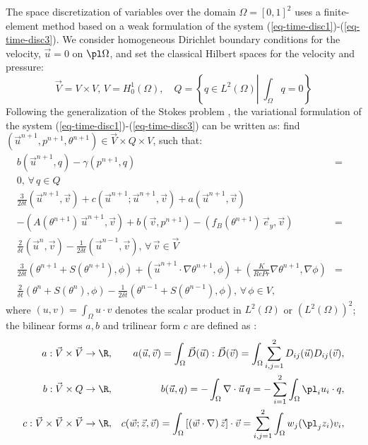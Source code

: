 The space discretization of variables over the domain $\Omega=[0,1]^2$ uses a finite-element method based on a weak formulation of the system (\ref{eq-time-disc1})-(\ref{eq-time-disc3}). 
We consider homogeneous Dirichlet boundary conditions for the velocity, \ie $\vec{u}=0$ on $\pl \Omega$, and set the classical Hilbert spaces for the velocity and pressure:
\begin{equation}
\vec{V}=V\times V, \, V=H^1_0(\Omega), \quad Q=\left\{q\in L^2(\Omega)\left|\; \int_{\Omega}q=0\right.\right\}
\end{equation}
Following the generalization of the Stokes problem \citep{Temam,GRaviart,Quarteroni}, the variational formulation of the system  (\ref{eq-time-disc1})-(\ref{eq-time-disc3}) can be written as: find $(\vec{u}^{n+1}, p^{n+1}, \theta^{n+1}) \in \vec{V}\times Q\times V$, such that:
\begin{eqnarray}
\label{eq-weak-all}
b\left(\vec{u}^{n+1}, q\right) - \gamma (p^{n+1},q)&=& \\ \nonumber
0, \, \forall \, q \in Q \\ \nonumber
\frac{3}{2 \delta t} \left(\vec{u}^{n+1},\vec{v}\right) + c\left(\vec{u}^{n+1} ; \vec{u}^{n+1}, \vec{v} \right) +
{a\left(\vec{u}^{n+1}, \vec{v}\right)} & &\\ \nonumber
- (A(\theta^{n+1}) \, \vec u^{n+1},\vec v)+ b\left(\vec{v}, p^{n+1}\right)
- {\left(f_B(\theta^{n+1}) \, \vec{e}_y,\vec{v}\right)}
&=& \\ \nonumber
\frac{2}{\delta t} \left(\vec{u}^{n},\vec{v}\right) 
- \frac{1}{2 \delta t} \left(\vec{u}^{n-1},\vec{v}\right), \, \forall \, \vec{v} \in \vec{V}\\  \nonumber
\frac{3}{2 \delta t} \left(\theta^{n+1} + S(\theta^{n+1}), \phi\right)
+\left(\vec{u}^{n+1} \cdot \nabla \theta^{n+1} , \phi
\right) +
\left( \frac{K}{Re Pr} \nabla \theta^{n+1}, \nabla \phi \right) &=& \\  \nonumber
\frac{2}{\delta t} \left( \theta^{n}+S(\theta^n), \phi\right)
- \frac{1}{2 \delta t} \left( \theta^{n-1}+S(\theta^{n-1}), \phi\right),\, \forall \, \phi \in V,
\end{eqnarray}
where {$(u , v)=\int_{\Omega} u\cdot v$} denotes the scalar product in $L^2(\Omega)$ or $\left(L^2(\Omega)\right)^2$; the bilinear forms $a, b$ and trilinear form $c$ are defined as \cite{GRaviart,Quarteroni}:
\begingroup \small{
	\begin{eqnarray*}\nonumber
		a: \vec{V} \times \vec{V} \rightarrow \R, & & {a(\vec{u},\vec{v})= \int_{\Omega}  
			 \vec{D}(\vec{u}) : \vec{D}(\vec{v}) = \int_{\Omega}   \sum_{i,j=1}^2{D}_{ij}(\vec{u}) {D}_{ij}(\vec{v})},\\ 
		b: \vec{V} \times Q \rightarrow \R, & & b(\vec{u},q) = -\int_{\Omega}\nabla \cdot\vec{u}\, q =
		-\sum_{i=1}^2\int_{\Omega}\pl_i u_i\cdot q, \\ \nonumber
		c: \vec{V} \times \vec{V} \times \vec{V} \rightarrow \R, & & c(\vec{w}; \vec{z}, \vec{v})=\int_{\Omega} \left[\left(\vec{w} \cdot \nabla\right) \vec{z}\right] \cdot\vec{v}
		=\sum_{i,j=1}^2\int_{\Omega} w_j (\pl_j z_i) v_i,
		\label{eq-biforms}
	\end{eqnarray*}
}
